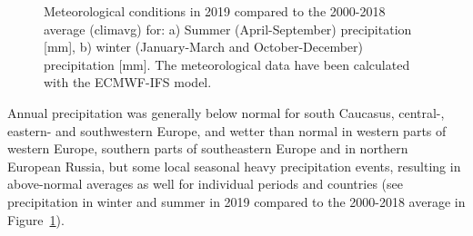 \begin{figure}[H]
  \caption{Meteorological conditions in 2019 compared to the 2000-2018 average (climavg) for: a) Summer (April-September) precipitation [mm], b) winter (January-March and October-December) precipitation [mm]. The meteorological data have been calculated with the ECMWF-IFS model.} 
\label{fig:prec-avMET}
\end{figure}

Annual precipitation was generally below normal for south Caucasus, central-, eastern- and southwestern Europe, and wetter than normal in western parts of western Europe, southern parts of southeastern Europe and in northern European Russia, but some local seasonal heavy precipitation events, resulting in above-normal averages as well for individual periods and countries (see precipitation in winter and summer in 2019 compared to the 2000-2018 average in Figure~\ref{fig:prec-avMET}). 

